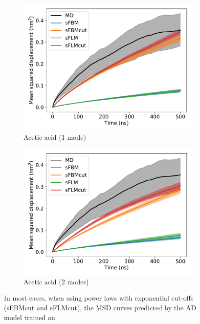 \documentclass{article}
\begin{document}
\begin{figure}
\begin{subfigure}{0.45\textwidth}
  \includegraphics[width=\textwidth]{1mode_msd_comparison_ACH_train_front.pdf}
  \caption{Acetic acid (1 mode)}\label{fig:1mode_msd_comparison_ACH_train_front}
  \end{subfigure}
  \begin{subfigure}{0.45\textwidth}
  \includegraphics[width=\textwidth]{2mode_msd_comparison_ACH_train_front.pdf}
  \caption{Acetic acid (2 modes)}\label{fig:2mode_msd_comparison_ACH_train_front}
  \end{subfigure} 
  \caption{In most cases, when using power laws with exponential cut-offs 
  (sFBMcut and sFLMcut), the MSD curves predicted by the AD model trained on 
}
\end{figure}
\end{document}
